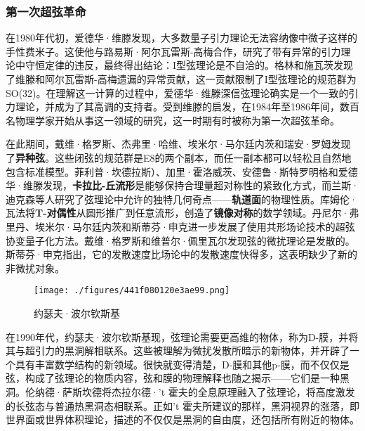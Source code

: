 \subsubsection{第一次超弦革命}
在1980年代初，爱德华·维滕发现，大多数量子引力理论无法容纳像中微子这样的手性费米子。这使他与路易斯·阿尔瓦雷斯-高梅合作，研究了带有异常的引力理论中守恒定律的违反，最终得出结论：I型弦理论是不自洽的。格林和施瓦茨发现了维滕和阿尔瓦雷斯-高梅遗漏的异常贡献，这一贡献限制了I型弦理论的规范群为SO(32)。在理解这一计算的过程中，爱德华·维滕深信弦理论确实是一个一致的引力理论，并成为了其高调的支持者。受到维滕的启发，在1984年至1986年间，数百名物理学家开始从事这一领域的研究，这一时期有时被称为第一次超弦革命。

在此期间，戴维·格罗斯、杰弗里·哈维、埃米尔·马尔廷内茨和瑞安·罗姆发现了\textbf{异种弦}。这些闭弦的规范群是E8的两个副本，而任一副本都可以轻松且自然地包含标准模型。菲利普·坎德拉斯）、加里·霍洛威茨、安德鲁·斯特罗明格和爱德华·维滕发现，\textbf{卡拉比-丘流形}是能够保持合理量超对称性的紧致化方式，而兰斯·迪克森等人研究了弦理论中允许的独特几何奇点——\textbf{轨道面}的物理性质。库姆伦·瓦法将\textbf{T-对偶性}从圆形推广到任意流形，创造了\textbf{镜像对称}的数学领域。丹尼尔·弗里丹、埃米尔·马尔廷内茨和斯蒂芬·申克进一步发展了使用共形场论技术的超弦协变量子化方法。戴维·格罗斯和维普尔·佩里瓦尔发现弦的微扰理论是发散的。斯蒂芬·申克指出，它的发散速度比场论中的发散速度快得多，这表明缺少了新的非微扰对象。
\begin{figure}[ht]
\centering
\texttt{[image: ./figures/441f080120e3ae99.png]}
\caption{约瑟夫·波尔钦斯基} \label{fig_String_16}
\end{figure}
在1990年代，约瑟夫·波尔钦斯基现，弦理论需要更高维的物体，称为D-膜，并将其与超引力的黑洞解相联系。这些被理解为微扰发散所暗示的新物体，并开辟了一个具有丰富数学结构的新领域。很快就变得清楚，D-膜和其他p-膜，而不仅仅是弦，构成了弦理论的物质内容，弦和膜的物理解释也随之揭示——它们是一种黑洞。伦纳德·萨斯坎德将杰拉尔德·'t 霍夫的全息原理融入了弦理论，将高度激发的长弦态与普通热黑洞态相联系。正如't 霍夫所建议的那样，黑洞视界的涨落，即世界面或世界体积理论，描述的不仅仅是黑洞的自由度，还包括所有附近的物体。
